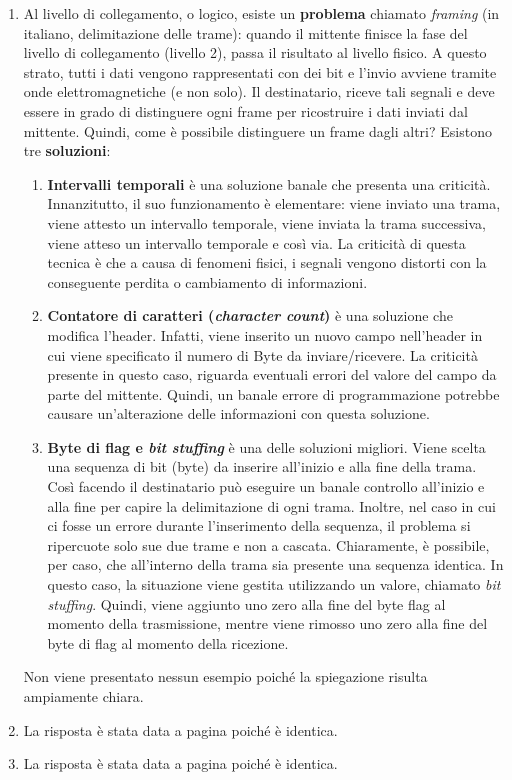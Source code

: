 \documentclass[a4paper]{article}
\begin{document}
	\begin{enumerate}
		\item Al livello di collegamento, o logico, esiste un \textbf{problema} chiamato \emph{framing} (in italiano, delimitazione delle trame): quando il mittente finisce la fase del livello di collegamento (livello 2), passa il risultato al livello fisico. A questo strato, tutti i dati vengono rappresentati con dei bit e l'invio avviene tramite onde elettromagnetiche (e non solo). Il destinatario, riceve tali segnali e deve essere in grado di distinguere ogni frame per ricostruire i dati inviati dal mittente. Quindi, come è possibile distinguere un frame dagli altri?\newline
		Esistono tre \textbf{soluzioni}:
		\begin{enumerate}
			\item \textbf{Intervalli temporali} è una soluzione banale che presenta una criticità. Innanzitutto, il suo funzionamento è elementare: viene inviato una trama, viene attesto un intervallo temporale, viene inviata la trama successiva, viene atteso un intervallo temporale e così via. La criticità di questa tecnica è che a causa di fenomeni fisici, i segnali vengono distorti con la conseguente perdita o cambiamento di informazioni.
			
			\item \textbf{Contatore di caratteri (\emph{character count})} è una soluzione che modifica l'header. Infatti, viene inserito un nuovo campo nell'header in cui viene specificato il numero di Byte da inviare/ricevere. La criticità presente in questo caso, riguarda eventuali errori del valore del campo da parte del mittente. Quindi, un banale errore di programmazione potrebbe causare un'alterazione delle informazioni con questa soluzione.
			
			\item \textbf{Byte di flag e \emph{bit stuffing}} è una delle soluzioni migliori. Viene scelta una sequenza di bit (byte) da inserire all'inizio e alla fine della trama. Così facendo il destinatario può eseguire un banale controllo all'inizio e alla fine per capire la delimitazione di ogni trama. Inoltre, nel caso in cui ci fosse un errore durante l'inserimento della sequenza, il problema si ripercuote solo sue due trame e non a cascata.\newpage
			Chiaramente, è possibile, per caso, che all'interno della trama sia presente una sequenza identica. In questo caso, la situazione viene gestita utilizzando un valore, chiamato \emph{bit stuffing}. Quindi, viene aggiunto uno zero alla fine del byte flag al momento della trasmissione, mentre viene rimosso uno zero alla fine del byte di flag al momento della ricezione.
		\end{enumerate}
		Non viene presentato nessun esempio poiché la spiegazione risulta ampiamente chiara.
		
		\item La risposta è stata data a pagina \pageref{DHCP} poiché è identica.
		
		\item La risposta è stata data a pagina \pageref{TCP chiusura connessione} poiché è identica.
	\end{enumerate}
	
\end{document}
